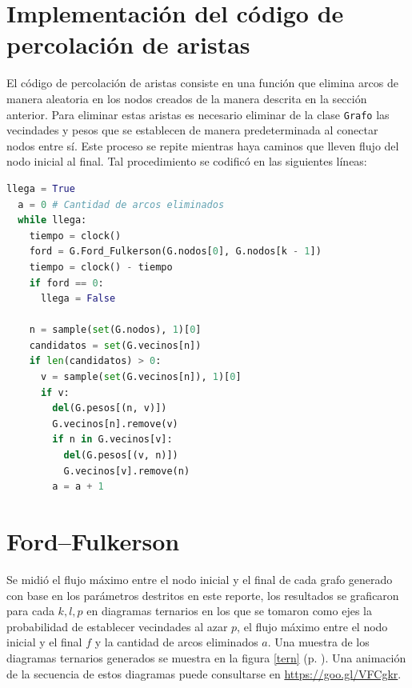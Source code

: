 \documentclass{article}
\begin{document}
  \section{Implementación del código de percolación de aristas}

  El código de percolación de aristas consiste en una función que elimina arcos de manera aleatoria en los nodos creados de la manera descrita en la sección anterior. Para eliminar estas aristas es necesario eliminar de la clase \texttt{Grafo} las vecindades y pesos que se establecen de manera predeterminada al conectar nodos entre sí. Este proceso se repite mientras haya caminos que lleven flujo del nodo inicial al final. Tal procedimiento se codificó en las siguientes líneas:

  \begin{lstlisting}[language = Python]
llega = True
  a = 0 # Cantidad de arcos eliminados
  while llega:
    tiempo = clock()
    ford = G.Ford_Fulkerson(G.nodos[0], G.nodos[k - 1])
    tiempo = clock() - tiempo
    if ford == 0:
      llega = False

    n = sample(set(G.nodos), 1)[0]
    candidatos = set(G.vecinos[n])
    if len(candidatos) > 0:
      v = sample(set(G.vecinos[n]), 1)[0]
      if v:
        del(G.pesos[(n, v)])
        G.vecinos[n].remove(v)
        if n in G.vecinos[v]:
          del(G.pesos[(v, n)])
          G.vecinos[v].remove(n)
        a = a + 1
  \end{lstlisting}

  \section{Ford--Fulkerson}

  Se midió el flujo máximo entre el nodo inicial y el final de cada grafo generado con base en los parámetros destritos en este reporte, los resultados se graficaron para cada $k, l, p$ en diagramas ternarios en los que se tomaron como ejes la probabilidad de establecer vecindades al azar $p$, el flujo máximo entre el nodo inicial y el final $f$ y la cantidad de arcos eliminados $a$. Una muestra de los diagramas ternarios generados se muestra en la figura \ref{tern} (p. \pageref{tern}). Una animación de la secuencia de estos diagramas puede consultarse en \url{https://goo.gl/VFCgkr}.
\end{document}
